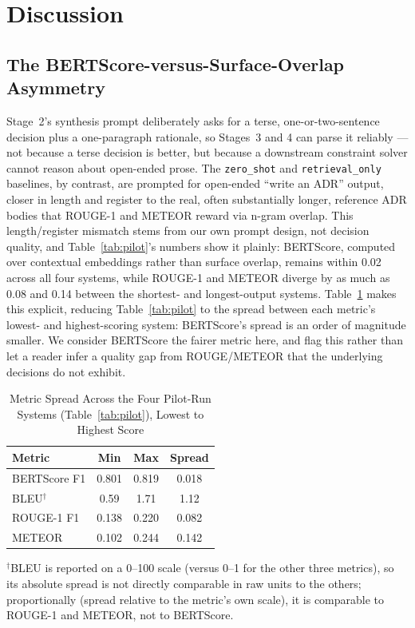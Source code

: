 \documentclass[lettersize,journal]{IEEEtran}
\begin{document}
\section{Discussion}
\label{sec:discussion}

\subsection{The BERTScore-versus-Surface-Overlap Asymmetry}

Stage~2's synthesis prompt deliberately asks for a terse, one-or-two-sentence decision plus a one-paragraph rationale, so Stages~3 and 4 can parse it reliably --- not because a terse decision is better, but because a downstream constraint solver cannot reason about open-ended prose. The \texttt{zero\_shot} and \texttt{retrieval\_only} baselines, by contrast, are prompted for open-ended ``write an ADR'' output, closer in length and register to the real, often substantially longer, reference ADR bodies that ROUGE-1 and METEOR reward via n-gram overlap. This length/register mismatch stems from our own prompt design, not decision quality, and Table~\ref{tab:pilot}'s numbers show it plainly: BERTScore, computed over contextual embeddings rather than surface overlap, remains within 0.02 across all four systems, while ROUGE-1 and METEOR diverge by as much as 0.08 and 0.14 between the shortest- and longest-output systems. Table~\ref{tab:metric-range} makes this explicit, reducing Table~\ref{tab:pilot} to the spread between each metric's lowest- and highest-scoring system: BERTScore's spread is an order of magnitude smaller. We consider BERTScore the fairer metric here, and flag this rather than let a reader infer a quality gap from ROUGE/METEOR that the underlying decisions do not exhibit.

\begin{table}[t]
\caption{Metric Spread Across the Four Pilot-Run Systems (Table~\ref{tab:pilot}), Lowest to Highest Score\label{tab:metric-range}}
\centering
\begin{tabular}{@{}lccc@{}}
\toprule
Metric & Min & Max & Spread \\
\midrule
BERTScore F1 & 0.801 & 0.819 & 0.018 \\
BLEU$^\dagger$ & 0.59 & 1.71 & 1.12 \\
ROUGE-1 F1   & 0.138 & 0.220 & 0.082 \\
METEOR       & 0.102 & 0.244 & 0.142 \\
\bottomrule
\end{tabular}

\vspace{2pt}
\footnotesize $^\dagger$BLEU is reported on a 0--100 scale (versus 0--1 for the other three metrics), so its absolute spread is not directly comparable in raw units to the others; proportionally (spread relative to the metric's own scale), it is comparable to ROUGE-1 and METEOR, not to BERTScore.
\end{table}
\end{document}
